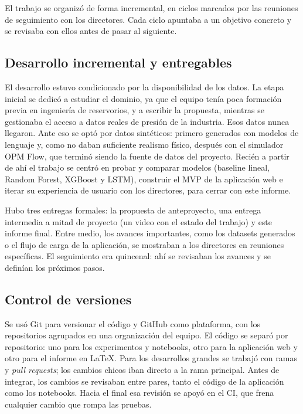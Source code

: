 \documentclass[12pt,a4paper]{article}
\begin{document}
El trabajo se organizó de forma incremental, en ciclos marcados por las reuniones de
seguimiento con los directores. Cada ciclo apuntaba a un objetivo concreto y se revisaba
con ellos antes de pasar al siguiente.

\subsection{Desarrollo incremental y entregables}

El desarrollo estuvo condicionado por la disponibilidad de los datos. La etapa inicial se
dedicó a estudiar el dominio, ya que el equipo tenía poca formación previa en ingeniería
de reservorios, y a escribir la propuesta, mientras se gestionaba el acceso a datos reales
de presión de la industria. Esos datos nunca llegaron. Ante eso se optó por datos
sintéticos: primero generados con modelos de lenguaje y, como no daban suficiente realismo
físico, después con el simulador OPM Flow, que terminó siendo la fuente de datos del
proyecto. Recién a partir de ahí el trabajo se centró en probar y comparar modelos
(baseline lineal, Random Forest, XGBoost y LSTM), construir el MVP de la aplicación web e
iterar su experiencia de usuario con los directores, para cerrar con este informe.

Hubo tres entregas formales: la propuesta de anteproyecto, una entrega intermedia a mitad
de proyecto (un video con el estado del trabajo) y este informe final. Entre medio, los
avances importantes, como los datasets generados o el flujo de carga de la aplicación, se
mostraban a los directores en reuniones específicas. El seguimiento era quincenal: ahí se
revisaban los avances y se definían los próximos pasos.

\subsection{Control de versiones}

Se usó Git para versionar el código y GitHub como plataforma, con los repositorios
agrupados en una organización del equipo. El código se separó por repositorio: uno para
los experimentos y notebooks, otro para la aplicación web y otro para el informe en
\LaTeX{}. Para los desarrollos grandes se trabajó con ramas y \textit{pull requests}; los
cambios chicos iban directo a la rama principal. Antes de integrar, los cambios se
revisaban entre pares, tanto el código de la aplicación como los notebooks. Hacia el final
esa revisión se apoyó en el CI, que frena cualquier cambio que rompa las pruebas.
\end{document}
